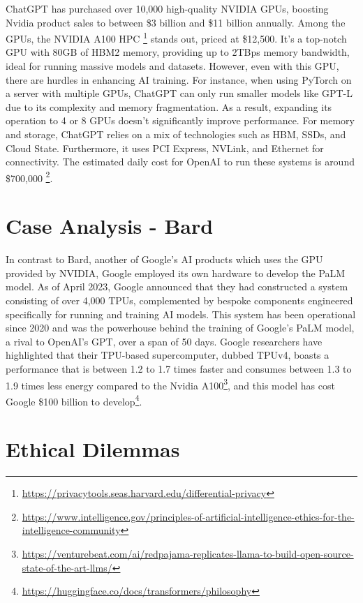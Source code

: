 \documentclass[
]{book}
\begin{document}
ChatGPT has purchased over 10,000 high-quality NVIDIA GPUs, boosting Nvidia product sales to between \$3 billion and \$11 billion annually. Among the GPUs, the NVIDIA A100 HPC \footnote{\url{https://privacytools.seas.harvard.edu/differential-privacy}} stands out, priced at \$12,500. It's a top-notch GPU with 80GB of HBM2 memory, providing up to 2TBps memory bandwidth, ideal for running massive models and datasets. However, even with this GPU, there are hurdles in enhancing AI training. For instance, when using PyTorch on a server with multiple GPUs, ChatGPT can only run smaller models like GPT-L due to its complexity and memory fragmentation. As a result, expanding its operation to 4 or 8 GPUs doesn't significantly improve performance. For memory and storage, ChatGPT relies on a mix of technologies such as HBM, SSDs, and Cloud State. Furthermore, it uses PCI Express, NVLink, and Ethernet for connectivity. The estimated daily cost for OpenAI to run these systems is around \$700,000 \footnote{\url{https://www.intelligence.gov/principles-of-artificial-intelligence-ethics-for-the-intelligence-community}}.

\hypertarget{case-analysis---bard}{%
\section{Case Analysis - Bard}\label{case-analysis---bard}}

In contrast to Bard, another of Google's AI products which uses the GPU provided by NVIDIA, Google employed its own hardware to develop the PaLM model. As of April 2023, Google announced that they had constructed a system consisting of over 4,000 TPUs, complemented by bespoke components engineered specifically for running and training AI models. This system has been operational since 2020 and was the powerhouse behind the training of Google's PaLM model, a rival to OpenAI's GPT, over a span of 50 days. Google researchers have highlighted that their TPU-based supercomputer, dubbed TPUv4, boasts a performance that is between 1.2 to 1.7 times faster and consumes between 1.3 to 1.9 times less energy compared to the Nvidia A100\footnote{\url{https://venturebeat.com/ai/redpajama-replicates-llama-to-build-open-source-state-of-the-art-llms/}}, and this model has cost Google \$100 billion to develop\footnote{\url{https://huggingface.co/docs/transformers/philosophy}}.

\hypertarget{ethical-dilemmas}{%
\section{Ethical Dilemmas}\label{ethical-dilemmas}}
\end{document}
